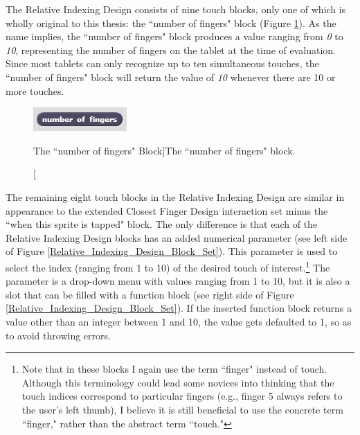 The Relative Indexing Design consists of nine touch blocks, only one of which is wholly original to this thesis: the ``number of fingers" block (Figure \ref{Number_Of_Fingers}). As the name implies, the ``number of fingers" block produces a value ranging from \emph{0} to \emph{10}, representing the number of fingers on the tablet at the time of evaluation. Since most tablets can only recognize up to ten simultaneous touches, the ``number of fingers" block will return the value of \emph{10} whenever there are 10 or more touches.

\begin{figure}
\centering
\includegraphics{images/Number_Of_Fingers.PNG}
\caption[The ``number of fingers" Block]{The ``number of fingers" block.}
\label{Number_Of_Fingers}
\end{figure}

The remaining eight touch blocks in the Relative Indexing Design are similar in appearance to the extended Closest Finger Design interaction set minus the ``when this sprite is tapped" block. The only difference is that each of the Relative Indexing Design blocks has an added numerical parameter (see left side of Figure \ref{Relative_Indexing_Design_Block_Set}). This parameter is used to select the index (ranging from 1 to 10) of the desired touch of interest.\footnote{Note that in these blocks I again use the term ``finger" instead of touch. Although this terminology could lead some novices into thinking that the touch indices correspond to particular fingers (e.g., finger 5 always refers to the user's left thumb), I believe it is still beneficial to use the concrete term ``finger," rather than the abstract term ``touch."}
The parameter is a drop-down menu with values ranging from 1 to 10, but it is also a slot that can be filled with a function block (see right side of Figure \ref{Relative_Indexing_Design_Block_Set}). If the inserted function block returns a value other than an integer between 1 and 10, the value gets defaulted to 1, so as to avoid throwing errors.

